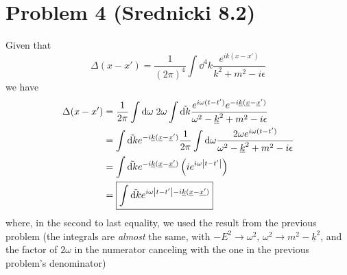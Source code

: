 \documentclass[12pt]{article}
\begin{document}
\section*{Problem 4 \small{(Srednicki 8.2)}}
Given that
\[ \Delta(x-x') = \frac{1}{(2\pi)^4}\int\dd^4 k \frac{e^{ik(x-x')}}{k^2 + m^2 - i\epsilon} \]
we have
\begin{align*}
    \Delta(x-x') &= \frac{1}{2\pi}\int\dd \omega \; 2\omega\int\tilde{\dd k}\frac{e^{i\omega(t-t')}e^{-i\underline{k}(\underline{x}-\underline{x}')}}{\omega^2 - \underline{k}^2 + m^2 - i\epsilon} \\
    &= \int\tilde{\dd k}e^{-i\underline{k}(\underline{x}-\underline{x}')}\frac{1}{2\pi}\int\dd \omega \frac{2\omega e^{i\omega(t-t')}}{\omega^2 - \underline{k}^2 + m^2 - i\epsilon} \\
    &= \int\tilde{\dd k}e^{-i\underline{k}(\underline{x}-\underline{x'})}\left(ie^{i\omega\abs{t-t'}}\right) \\
    &= \boxed{\int\tilde{\dd k}e^{i\omega\abs{t-t'}-i\underline{k}(\underline{x}-\underline{x'})}}
\end{align*}
where, in the second to last equality, we used the result from the previous problem (the integrals are \textit{almost} the same, with $-E^2\to\omega^2$, $\omega^2 \to m^2-\underline{k}^2$, and the factor of $2\omega$ in the numerator canceling with the one in the previous problem's denominator)
\end{document}
